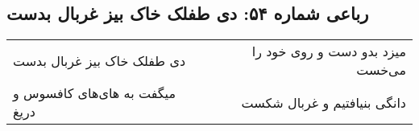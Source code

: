 \begin{center}
\section*{رباعی شماره ۵۴: دی طفلک خاک بیز غربال بدست}
\label{sec:sh054}
\begin{longtable}{l p{0.5cm} r}
دی طفلک خاک بیز غربال بدست
&&
میزد بدو دست و روی خود را می‌خست
\\
میگفت به های‌های کافسوس و دریغ
&&
دانگی بنیافتیم و غربال شکست
\\
\end{longtable}
\end{center}
